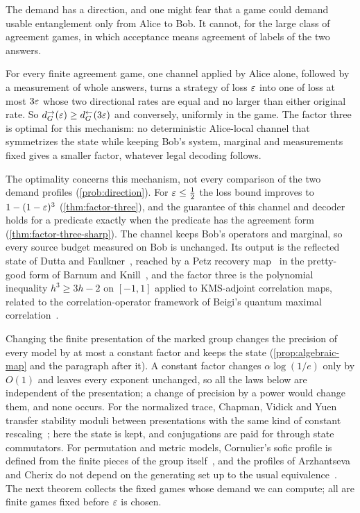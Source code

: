 The demand has a direction, and one might fear that a game could demand usable entanglement only from Alice to Bob. It cannot,
for the large class of agreement games, in which acceptance means agreement of labels of the two answers.

\begin{theoremB}
For every finite agreement game, one channel applied by Alice alone, followed by a measurement of whole answers, turns a strategy
of loss $\varepsilon$ into one of loss at most $3\varepsilon$ whose two directional rates are equal and no larger than either original rate. So
$d^\to_G(\varepsilon)\ge d^\leftarrow_G(3\varepsilon)$ and conversely, uniformly in the game. The factor three is optimal for this mechanism: no
deterministic Alice-local channel that symmetrizes the state while keeping Bob's system, marginal and measurements fixed gives a
smaller factor, whatever legal decoding follows.
\end{theoremB}

The optimality concerns this mechanism, not every comparison of the two demand profiles (\cref{prob:direction}). For
$\varepsilon\le\frac12$ the loss bound improves to $1-(1-\varepsilon)^3$ (\cref{thm:factor-three}), and the guarantee of this channel and
decoder holds for a predicate exactly when the predicate has the agreement form (\cref{thm:factor-three-sharp}). The channel
keeps Bob's operators and
marginal, so every source budget measured on Bob is unchanged. Its output is the reflected
state of Dutta and Faulkner~\cite{DF19}, reached by a Petz recovery map~\cite{Petz86} in the pretty-good form of Barnum and
Knill~\cite{BK02,BCW14}, and the factor three is the polynomial inequality $h^3\ge3h-2$ on $[-1,1]$ applied to KMS-adjoint
correlation maps, related to the correlation-operator framework of Beigi's quantum maximal correlation~\cite{Bei13}.

Changing the finite presentation of the marked group changes the precision of every model by at most a constant factor and keeps
the state (\cref{prop:algebraic-map} and the paragraph after it). A constant factor changes $\alpha\log(1/e)$ only by $O(1)$ and
leaves every exponent unchanged, so all the laws below are independent of the presentation; a change of precision by a power
would change them, and none occurs. For the normalized trace, Chapman, Vidick and Yuen transfer stability moduli between
presentations with the same kind of constant rescaling~\cite[Lemma~2.6]{CVY26}; here the state is kept, and conjugations are paid
for through state commutators. For permutation and metric models, Cornulier's sofic profile is defined from the finite pieces of the
group itself~\cite{Cor13}, and the profiles of Arzhantseva and Cherix do not depend on the generating set up to the usual
equivalence~\cite{AC24}. The next theorem collects the fixed games whose demand we can compute; all are finite games fixed
before $\varepsilon$ is chosen.

